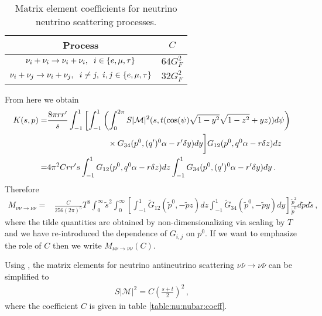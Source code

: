 \begin{table}[ht]
\centering 
\begin{tabular}{|c|c|}
\hline
Process &$C$ \\
\hline
$\nu_i+\nu_i\rightarrow\nu_i+\nu_i,\hspace{2mm} i\in\{e,\mu,\tau\}$& $64 G_F^2$\\
\hline
$\nu_i+\nu_j\rightarrow\nu_i+\nu_j,\hspace{2mm} i\neq j, \hspace{1mm} i,j\in\{e,\mu,\tau\}$& $32 G_F^2$\\
\hline
\end{tabular}
\caption{Matrix element coefficients for neutrino neutrino scattering processes.}
\label{table:nu:nu:coeff}
\end{table}
From here we obtain
\begin{align}
K(s,p)=&\frac{8\pi rr^{\prime}}{s}\int_{-1}^1 \left[\int_{-1}^1\left(\int_0^{2\pi}S|\mathcal{M}|^2 (s,t(\cos(\psi)\sqrt{1-y^2}\sqrt{1-z^2}+yz))d\psi\right)\right.\\
&\hspace{26mm}\times G_{34}(p^0,(q^{\prime})^0\alpha-r^{\prime}\delta y) dy\bigg] G_{12}(p^0,q^0\alpha-r\delta z)dz\notag\\
=& 4\pi^2 Crr^{\prime}s \int_{-1}^1 G_{12}(p^0,q^0\alpha-r\delta z)dz \int_{-1}^1G_{34}(p^0,(q^{\prime})^0\alpha-r^{\prime}\delta y) dy\,.\notag
\end{align}
Therefore
\begin{align}
M_{\nu\nu\rightarrow\nu\nu}=&\frac{C}{256(2\pi)^5 } T^8\!\!\!\int_{0}^\infty\!\!\!\tilde{s}^2\!\!\int_0^\infty  \left[\int_{-1}^1 \tilde{G}_{12}(\tilde p^0,-\tilde{p} z)dz \int_{-1}^1\tilde{G}_{34}(\tilde p^0,-\tilde{p} y) dy\right]\frac{\tilde{p}^2}{\tilde{p}^0}d\tilde{p}d\tilde{s}\,,
\end{align}
where the tilde quantities are obtained by non-dimensionalizing via scaling by $T$ and we have re-introduced the dependence of $G_{i,j}$ on $p^0$. If we want to emphasize the role of $C$ then we write $M_{\nu\nu\rightarrow\nu\nu}(C)$.




 Using , the matrix elements for neutrino antineutrino scattering $\nu\bar{\nu}\rightarrow\nu\bar{\nu}$ can be simplified to
\begin{align}
S|\mathcal{M}|^2=C\left(\frac{s+t}{2}\right)^2\,,
\end{align}
where the coefficient $C$ is given in table \ref{table:nu:nubar:coeff}.

